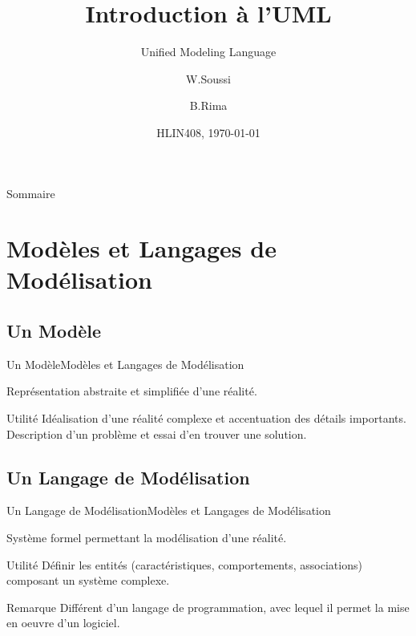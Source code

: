 \documentclass{beamer}
\title{Introduction à l'UML}
\subtitle{Unified Modeling Language}
\author{W.Soussi \and B.Rima}
\institute[UM]{L2 CMI Informatique}
\date{HLIN408, \today{}}
\begin{document}
\begin{frame}
  \titlepage
\end{frame}

\begin{frame}{Sommaire}
  \tableofcontents
\end{frame}

\section{Modèles et Langages de Modélisation}

  \subsection{Un Modèle}
    \begin{frame}{Un Modèle}{Modèles et Langages de Modélisation}
        \begin{Definition}
        Représentation abstraite et simplifiée d'une réalité.
        \pause
        \end{Definition}
        \begin{block}{Utilité}
          Idéalisation d'une réalité complexe et accentuation des détails importants.\\
          Description d'un problème et essai d'en trouver une solution.
        \end{block}
    \end{frame}

  \subsection{Un Langage de Modélisation}
    \begin{frame}{Un Langage de Modélisation}{Modèles et Langages de Modélisation}
      \begin{Definition}
        Système formel permettant la modélisation d'une réalité.
       \pause
      \end{Definition}
      \begin{block}{Utilité}
        Définir les entités (caractéristiques, comportements, associations) composant un système complexe.
        \pause
      \end{block}
      \begin{block}{Remarque}
        Différent d'un langage de programmation, avec lequel il permet la mise en oeuvre d'un logiciel.
      \end{block}
    \end{frame}
\end{document}
